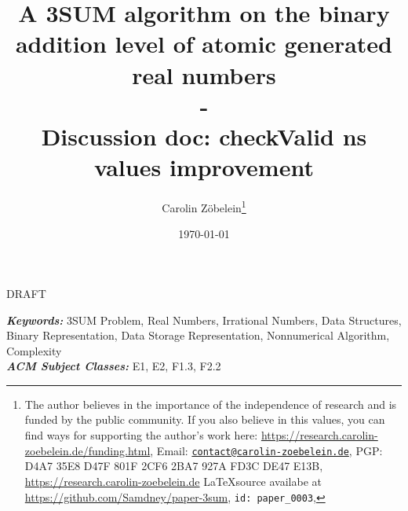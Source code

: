 \documentclass{article}
\newtheorem*{theorem A}{Theorem A}
\newtheorem*{theorem B}{N\"olker's Theorem}
\theoremstyle{remark}
\theoremstyle{remark}
\begin{document}
\title{A 3SUM algorithm on the binary addition level of atomic generated real numbers\\
-\\
Discussion doc: checkValid ns values improvement}
\author{Carolin Z\"obelein\thanks{The author believes in the importance of the independence of research and is funded by the public community. If you also believe in this values, you can find ways for supporting the author's work here: \url{https://research.carolin-zoebelein.de/funding.html}, Email: \href{mailto:contact@carolin-zoebelein.de}{\texttt{contact@carolin-zoebelein.de}}, PGP: D4A7 35E8 D47F 801F 2CF6 2BA7 927A FD3C DE47 E13B, \url{https://research.carolin-zoebelein.de} \LaTeX source availabe at \url{https://github.com/Samdney/paper-3sum}, \texttt{id: paper\_0003}, \Cooley}}
\date{\today}
\maketitle
\begin{center}
    DRAFT
\end{center}
\begin{abstract}
    \blindtext[1]
\end{abstract}
\providecommand{\keywords}[1]{\small{\textbf{\textit{Keywords:}} #1}}
\providecommand{\Classification}[1]{\small{\textbf{\textit{ACM Subject Classes:}} #1}}

\begin{flushleft}
    \keywords{3SUM Problem, Real Numbers, Irrational Numbers, Data Structures, Binary Representation, Data Storage Representation, Nonnumerical Algorithm, Complexity}\\
    \Classification{E1, E2, F1.3, F2.2}
\end{flushleft}
\tableofcontents
\end{document}
